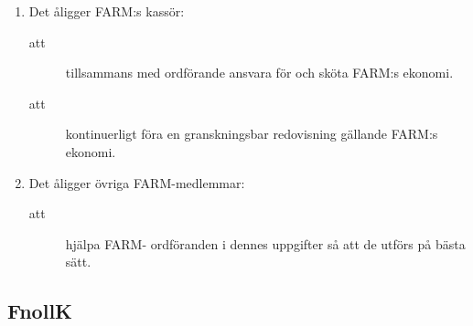 \documentclass[11pt,a4paper]{article}
\begin{document}
\begin{enumerate}[\thesubsection .1]
  \item Det åligger FARM:s kassör:
    \begin{description}
      \item[att] tillsammans med ordförande ansvara för och sköta FARM:s ekonomi.
      \item[att] kontinuerligt föra en granskningsbar redovisning gällande FARM:s ekonomi.
    \end{description}

  \item Det åligger övriga FARM-medlemmar:
    \begin{description}
      \item[att] hjälpa FARM- ordföranden i dennes uppgifter så att de utförs på bästa sätt.
    \end{description}

\end{enumerate}


\subsection{FnollK}
\end{document}
